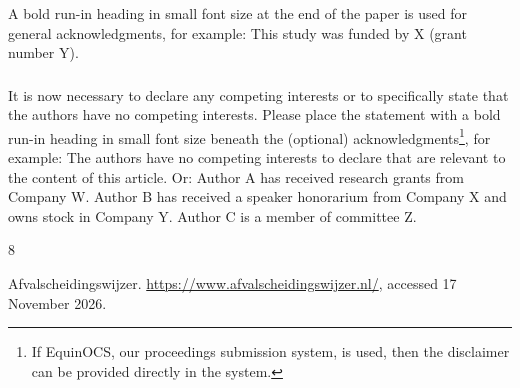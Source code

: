\documentclass[runningheads]{llncs}
\begin{document}
\begin{credits}
\subsubsection{\ackname} A bold run-in heading in small font size at the end of the paper is
used for general acknowledgments, for example: This study was funded
by X (grant number Y).

\subsubsection{\discintname}
It is now necessary to declare any competing interests or to specifically
state that the authors have no competing interests. Please place the
statement with a bold run-in heading in small font size beneath the
(optional) acknowledgments\footnote{If EquinOCS, our proceedings submission
system, is used, then the disclaimer can be provided directly in the system.},
for example: The authors have no competing interests to declare that are
relevant to the content of this article. Or: Author A has received research
grants from Company W. Author B has received a speaker honorarium from
Company X and owns stock in Company Y. Author C is a member of committee Z.
\end{credits}
%
%
%
% 
% 
%
\begin{thebibliography}{8}

Afvalscheidingswijzer.
\url{https://www.afvalscheidingswijzer.nl/},
accessed 17 November 2026.

\end{thebibliography}
\end{document}
